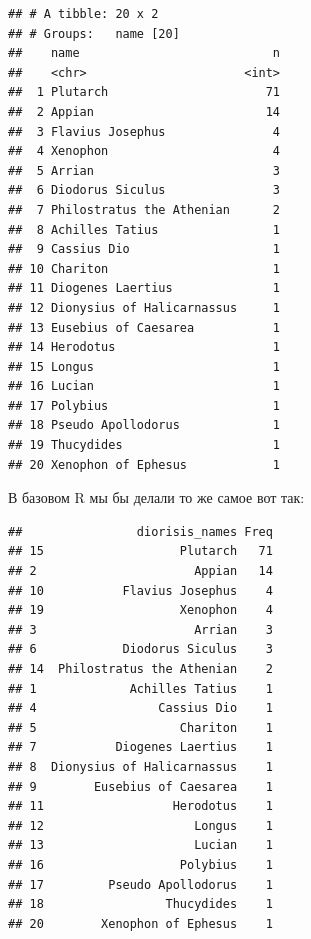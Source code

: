 \documentclass[
]{book}
\newenvironment{Shaded}{\begin{snugshade}}{\end{snugshade}}
\newcommand{\AttributeTok}[1]{\textcolor[rgb]{0.13,0.29,0.53}{#1}}
\newcommand{\CommentTok}[1]{\textcolor[rgb]{0.56,0.35,0.01}{\textit{#1}}}
\newcommand{\DecValTok}[1]{\textcolor[rgb]{0.00,0.00,0.81}{#1}}
\newcommand{\FunctionTok}[1]{\textcolor[rgb]{0.13,0.29,0.53}{\textbf{#1}}}
\newcommand{\NormalTok}[1]{#1}
\newcommand{\OtherTok}[1]{\textcolor[rgb]{0.56,0.35,0.01}{#1}}
\newcommand{\SpecialCharTok}[1]{\textcolor[rgb]{0.81,0.36,0.00}{\textbf{#1}}}
\newcommand{\StringTok}[1]{\textcolor[rgb]{0.31,0.60,0.02}{#1}}
\theoremstyle{definition}
\theoremstyle{definition}
\theoremstyle{definition}
\theoremstyle{definition}
\theoremstyle{remark}
\begin{document}
\begin{verbatim}
## # A tibble: 20 x 2
## # Groups:   name [20]
##    name                           n
##    <chr>                      <int>
##  1 Plutarch                      71
##  2 Appian                        14
##  3 Flavius Josephus               4
##  4 Xenophon                       4
##  5 Arrian                         3
##  6 Diodorus Siculus               3
##  7 Philostratus the Athenian      2
##  8 Achilles Tatius                1
##  9 Cassius Dio                    1
## 10 Chariton                       1
## 11 Diogenes Laertius              1
## 12 Dionysius of Halicarnassus     1
## 13 Eusebius of Caesarea           1
## 14 Herodotus                      1
## 15 Longus                         1
## 16 Lucian                         1
## 17 Polybius                       1
## 18 Pseudo Apollodorus             1
## 19 Thucydides                     1
## 20 Xenophon of Ephesus            1
\end{verbatim}

В базовом R мы бы делали то же самое вот так:

\begin{Shaded}
\end{Shaded}

\begin{verbatim}
##                diorisis_names Freq
## 15                   Plutarch   71
## 2                      Appian   14
## 10           Flavius Josephus    4
## 19                   Xenophon    4
## 3                      Arrian    3
## 6            Diodorus Siculus    3
## 14  Philostratus the Athenian    2
## 1             Achilles Tatius    1
## 4                 Cassius Dio    1
## 5                    Chariton    1
## 7           Diogenes Laertius    1
## 8  Dionysius of Halicarnassus    1
## 9        Eusebius of Caesarea    1
## 11                  Herodotus    1
## 12                     Longus    1
## 13                     Lucian    1
## 16                   Polybius    1
## 17         Pseudo Apollodorus    1
## 18                 Thucydides    1
## 20        Xenophon of Ephesus    1
\end{verbatim}
\end{document}
